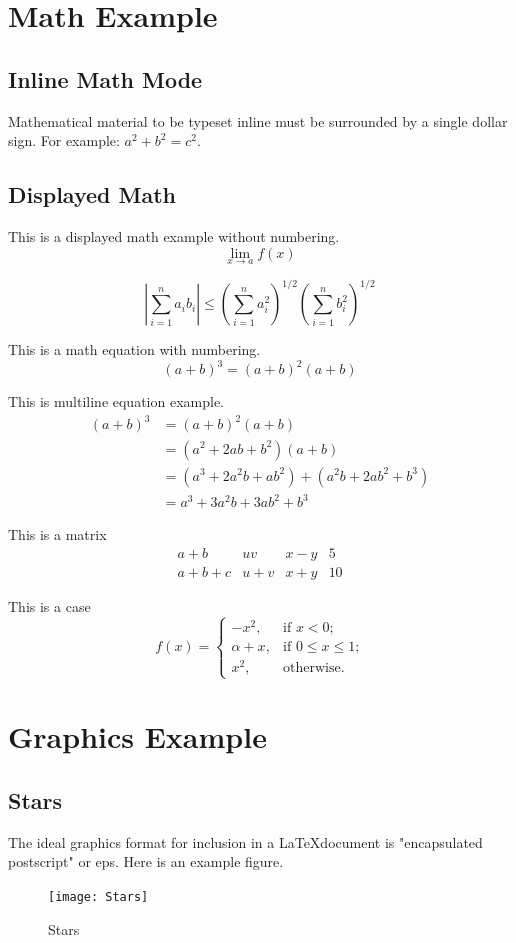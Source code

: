 \section{Math Example}
\subsection{Inline Math Mode}
Mathematical material to be typeset inline must be surrounded by a
single dollar sign. For example: $a^2 + b^2 = c^2$.
\subsection{Displayed Math}
This is a displayed math example without numbering.
\[
\lim_{x \to a}f(x)
\]

\[
\left|\sum_{i=1}^n a_ib_i\right| \le \left(\sum_{i=1}^n
a_i^2\right)^{1/2} \left(\sum_{i=1}^n b_i^2\right)^{1/2}
\]

This is a math equation with numbering.
\begin{equation}
(a+b)^3 = (a+b)^2(a+b)
\end{equation}

This is multiline equation example.
\begin{align}
(a+b)^3 &= (a+b)^2(a+b)\\
&=(a^2+2ab+b^2)(a+b)\\
&=(a^3+2a^2b+ab^2) + (a^2b+2ab^2+b^3)\\
&=a^3+3a^2b+3ab^2+b^3
\end{align}

This is a matrix
\[
\begin{matrix}
    a+b & uv & x-y & 5\\
    a+b+c & u+v &x+y & 10
\end{matrix}
\]

This is a case
\[
f(x)=
\begin{cases}
    -x^{2}, &\text{if $x<0$;}\\
    \alpha+x, &\text{if $0 \leq x \leq 1$;}\\
    x^{2}, &\text{otherwise.}
\end{cases}
\]

\section{Graphics Example}
\subsection{Stars}
The ideal graphics format for inclusion in a \LaTeX document is
"encapsulated postscript" or eps. Here is an example figure.
\begin{figure}[htbp]
\begin{center}
\texttt{[image: Stars]}
\caption{Stars}
\end{center}
\end{figure}
